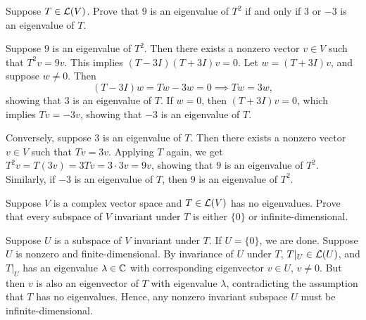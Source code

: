 \begin{exc}

\begin{exercise}
Suppose $T\in\mathcal{L}(V)$. Prove that $9$ is an eigenvalue of $T^2$ if and only if
$3$ or $-3$ is an eigenvalue of $T$.
\end{exercise}
\begin{solution}
Suppose $9$ is an eigenvalue of $T^2$. Then there exists a nonzero vector
$v\in V$ such that $T^2v=9v$. This implies $(T-3I)(T+3I)v=0$. Let
$w=(T+3I)v$, and suppose $w\ne0$. Then
\[ (T-3I)w=Tw-3w=0 \implies Tw=3w, \]
showing that $3$ is an eigenvalue of $T$. If $w=0$, then $(T+3I)v=0$, which
implies $Tv=-3v$, showing that $-3$ is an eigenvalue of $T$.

Conversely, suppose $3$ is an eigenvalue of $T$. Then there exists a nonzero
vector $v\in V$ such that $Tv=3v$. Applying $T$ again, we get
$T^2v=T(3v)=3Tv=3\cdot3v=9v$, showing that $9$ is an eigenvalue of $T^2$.
Similarly, if $-3$ is an eigenvalue of $T$, then $9$ is an eigenvalue of
$T^2$.
\end{solution}

\begin{exercise}
Suppose $V$ is a complex vector space and $T\in\mathcal{L}(V)$ has no eigenvalues.
Prove that every subspace of $V$ invariant under $T$ is either $\{0\}$ or
infinite-dimensional.
\end{exercise}
\begin{solution}
Suppose $U$ is a subspace of $V$ invariant under $T$. If $U=\{0\}$, we are
done. Suppose $U$ is nonzero and finite-dimensional. By invariance of $U$
under $T$, $T|_U\in\mathcal{L}(U)$, and $T|_U$ has an eigenvalue $\lambda\in\mathbb{C}$ with
corresponding eigenvector $v\in U$, $v\ne0$. But then $v$ is also an
eigenvector of $T$ with eigenvalue $\lambda$, contradicting the assumption
that $T$ has no eigenvalues. Hence, any nonzero invariant subspace $U$ must be
infinite-dimensional.
\end{solution}


\end{exc}
